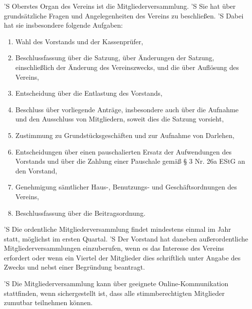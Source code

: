 \documentclass[a4paper,10pt]{scrreprt}
\begin{document}
\begin{contract}

'S Oberstes Organ des Vereins ist die Mitgliederversammlung.
'S Sie hat über grundsätzliche Fragen und Angelegenheiten des Vereins zu
beschließen.
'S Dabei hat sie insbesondere folgende Aufgaben:
\begin{enumerate}
	\item Wahl des Vorstands und der Kassenprüfer,
	\item Beschlussfassung über die Satzung, über Änderungen der Satzung,
	      einschließlich der Änderung des Vereinszwecks, und die über
		  Auflösung des Vereins,
	\item Entscheidung über die Entlastung des Vorstands,
	\item Beschluss über vorliegende Anträge, insbesondere auch über die
	      Aufnahme und den Ausschluss von Mitgliedern, soweit dies die Satzung
		  vorsieht,
	\item Zustimmung zu Grundstücksgeschäften und zur Aufnahme von Darlehen,
	\item Entscheidungen über einen pauschalierten Ersatz der Aufwendungen des
	      Vorstands und über die Zahlung einer Pauschale gemäß § 3 Nr. 26a EStG
		  an den Vorstand,
	\item Genehmigung sämtlicher Haus-, Benutzungs- und Geschäftsordnungen des
	      Vereins,
	\item Beschlussfassung über die Beitragsordnung.
\end{enumerate}

'S Die ordentliche Mitgliederversammlung findet mindestens einmal im Jahr
statt, möglichst im ersten Quartal.
'S Der Vorstand hat daneben außerordentliche Mitgliederversammlungen
einzuberufen, wenn es das Interesse des Vereins erfordert oder wenn ein Viertel
der Mitglieder dies schriftlich unter Angabe des Zwecks und nebst einer
Begründung beantragt.

'S Die Mitgliederversammlung kann über geeignete Online-Kommunikation
stattfinden, wenn sichergestellt ist, dass alle stimmberechtigten Mitglieder
zumutbar teilnehmen können.


\end{contract}
\end{document}
